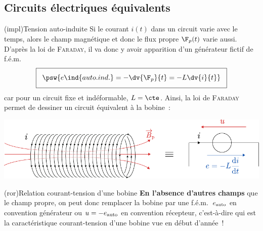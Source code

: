\documentclass[../../main/main.tex]{subfiles}
\begin{document}
\subsection{Circuits électriques équivalents}
\label{ssec:celecequiv}
\begin{tcb*}(impl){Tension auto-induite}
	Si le courant $i(t)$ dans un circuit varie avec le temps, alors le champ
	magnétique et donc le flux propre $\F_p(t)$ varie aussi. D'après la loi de
	\textsc{Faraday}, il va donc y avoir apparition d'un générateur fictif de
	f.é.m.\
	\[
		\setlength{\fboxsep}{3mm}
		\boxed{
			\psw{e\ind{auto.ind.} = -\dv{\F_p}{t} = -L \dv{i}{t}}
		}
	\]
	car pour un circuit fixe et indéformable, $L = \cte$. Ainsi, la loi de
	\textsc{Faraday} permet de dessiner un circuit équivalent à la bobine~:
	\vspace{-25pt}
	\begin{center}
		\includegraphics[width=\linewidth]{faraeind}
	\end{center}
\end{tcb*}


\begin{tcb*}(ror){Relation courant-tension d'une bobine}
	\textbf{En l'absence d'autres champs} que le champ propre, on peut donc remplacer
	la bobine par une f.é.m.\ $e_{\rm auto}$ en convention générateur ou $u =
		-e_{\rm auto}$ en convention récepteur, c'est-à-dire
	\psw{%
		\[
			\boxed{u = L \dv{i}{t}}
		\]
	}%
	qui est la caractéristique courant-tension d'une bobine vue en début d'année~!
	\begin{center}
		\label{fig:faraequiv}
	\end{center}
\end{tcb*}
\end{document}
